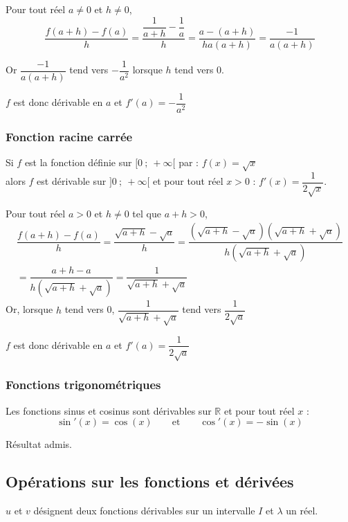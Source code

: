 \documentclass[french]{book}
\newcommand{\R}{\mathbb {R}}
\begin{document}
\begin{demo}
Pour tout réel $a\neq 0$ et $h\neq 0$, \[\dfrac{f(a+h)-f(a)}{h}=\dfrac{\dfrac{1}{a+h}-\dfrac{1}{a}}{h}=\dfrac{a-(a+h)}{ha(a+h)}=\dfrac{-1}{a(a+h)}\]

Or $\dfrac{-1}{a(a+h)}$ tend vers $-\dfrac{1}{a^{2}}$ lorsque $h$ tend vers 0.

$f$ est donc dérivable en $a$ et $f'(a)=-\dfrac{1}{a^{2}}$
\end{demo}

\subsubsection*{Fonction racine carrée}
\begin{prop}

Si $f$ est la fonction définie sur $[0~;~+\infty[$ par :  $f(x)=\sqrt{x}$ \\
alors $f$ est dérivable sur $]0~;~+\infty[$ et pour tout réel $x>0$ :  $f'(x)=\dfrac{1}{2\sqrt{x}}$.

\end{prop}

\begin{demo}
Pour tout réel $a>0$ et $h\neq 0$ tel que $a+h>0$,
\begin{multline*}
\dfrac{f(a+h)-f(a)}{h}=\dfrac{\sqrt{a+h}-\sqrt{a}}{h}=\dfrac{(\sqrt{a+h}-\sqrt{a})(\sqrt{a+h}+\sqrt{a})}{h(\sqrt{a+h}+\sqrt{a})}\\
=\dfrac{a+h-a}{h(\sqrt{a+h}+\sqrt{a})}=\dfrac{1}{\sqrt{a+h}+\sqrt{a}}
\end{multline*}
Or, lorsque $h$ tend vers 0, $\dfrac{1}{\sqrt{a+h}+\sqrt{a}}$ tend vers $\dfrac{1}{2\sqrt{a}}$

$f$ est donc dérivable en $a$ et $f'(a)=\dfrac{1}{2\sqrt{a}}$
\end{demo}

\subsubsection*{Fonctions trigonométriques}
\begin{prop}
Les fonctions sinus et cosinus sont dérivables sur $\R$ et pour tout réel $x$ :
\[\sin'(x)=\cos(x)\hspace{2em}\text{et}\hspace{2em}\cos'(x)=-\sin(x)\]
\end{prop}

Résultat admis.

\subsection{Opérations sur les fonctions et dérivées}
$u$ et $v$ désignent deux fonctions dérivables sur un intervalle $I$ et $\lambda$ un réel.
\end{document}
